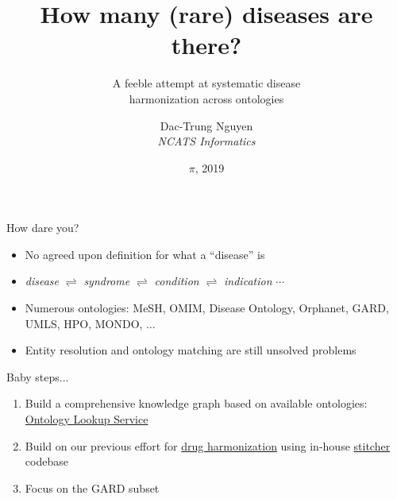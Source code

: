 ﻿\documentclass[anchorcolor=blue,linkcolor=blue]{beamer}
\title{How many (rare) diseases are there?}
\subtitle{A feeble attempt at systematic disease\\
  harmonization across ontologies}
\author{Dac-Trung Nguyen\\[1em] \emph{NCATS Informatics}}
\date{{\Large$\pi\!$}, 2019}
\begin{document}
\begin{frame}
  \titlepage
\end{frame}

\begin{frame}
  \begin{block}{How dare you?}
    \begin{itemize}
    \item No agreed upon definition for what a ``disease'' is
    \item \emph{disease} $\rightleftharpoons$ \emph{syndrome}
      $\rightleftharpoons$ \emph{condition} $\rightleftharpoons$
      \emph{indication} $\cdots$
    \item Numerous ontologies: MeSH, OMIM, Disease Ontology, Orphanet,
      GARD, UMLS, HPO, MONDO, $\ldots$
    \item Entity resolution and ontology matching are still unsolved
      problems
    \end{itemize}
  \end{block}
  \begin{block}{Baby steps...}
    \begin{enumerate}
      \item Build a comprehensive knowledge graph based on available
        ontologies: \href{https://www.ebi.ac.uk/ols/ontologies}{Ontology
          Lookup Service}
      \item Build on our previous effort for
        \href{https://stitcher.ncats.io/app/stitches/latest}{drug harmonization} using
        in-house
        \href{https://spotlite.nih.gov/ncats/stitcher.git}{stitcher} codebase
      \item Focus on the GARD subset
    \end{enumerate}
  \end{block}
\end{frame}
\end{document}
